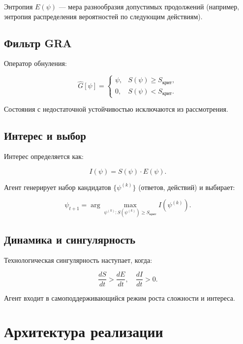 \documentclass[12pt,a4paper]{article}
\begin{document}
Энтропия $E(\psi)$ — мера разнообразия допустимых продолжений (например, энтропия распределения вероятностей по следующим действиям).

\subsection{Фильтр GRA}

Оператор обнуления:

\begin{equation}
\hat{G}[\psi] = \begin{cases}
\psi, & S(\psi) \ge S_{\text{крит}},\\
0, & S(\psi) < S_{\text{крит}}.
\end{cases}
\end{equation}

Состояния с недостаточной устойчивостью исключаются из рассмотрения.

\subsection{Интерес и выбор}

Интерес определяется как:

\begin{equation}
I(\psi) = S(\psi) \cdot E(\psi).
\end{equation}

Агент генерирует набор кандидатов $\{\psi^{(k)}\}$ (ответов, действий) и выбирает:

\begin{equation}
\psi_{t+1} = \arg\max_{\psi^{(k)}: S(\psi^{(k)}) \ge S_{\text{крит}}} I(\psi^{(k)}).
\end{equation}

\subsection{Динамика и сингулярность}

Технологическая сингулярность наступает, когда:

\begin{equation}
\frac{dS}{dt} > \frac{dE}{dt}, \quad \frac{dI}{dt} > 0.
\end{equation}

Агент входит в самоподдерживающийся режим роста сложности и интереса.

\section{Архитектура реализации}
\end{document}
